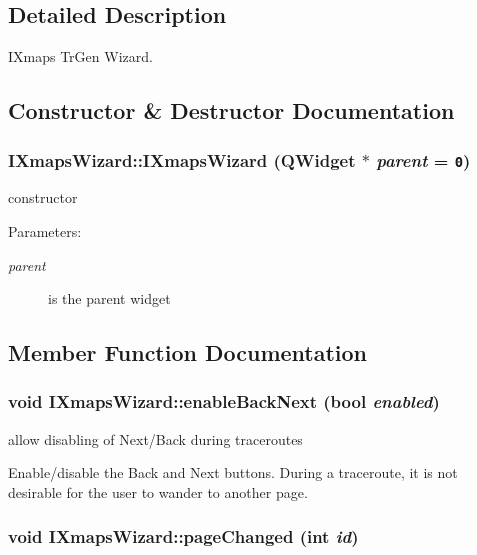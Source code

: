 \subsection{Detailed Description}
IXmaps TrGen Wizard. 

\subsection{Constructor \& Destructor Documentation}
\hypertarget{classIXmapsWizard_eb12ce3ab9cfbc2fcd1f7c84adfedea2}{
\subsubsection[IXmapsWizard]{\setlength{\rightskip}{0pt plus 5cm}IXmapsWizard::IXmapsWizard (QWidget $\ast$ {\em parent} = {\tt 0})}}
\label{classIXmapsWizard_eb12ce3ab9cfbc2fcd1f7c84adfedea2}


constructor \begin{Desc}
\item[Parameters:]
\begin{description}
\item[{\em parent}]is the parent widget \end{description}
\end{Desc}


\subsection{Member Function Documentation}
\hypertarget{classIXmapsWizard_142598b5e0943b66b8817cc7da82c979}{
\subsubsection[enableBackNext]{\setlength{\rightskip}{0pt plus 5cm}void IXmapsWizard::enableBackNext (bool {\em enabled})}}
\label{classIXmapsWizard_142598b5e0943b66b8817cc7da82c979}


allow disabling of Next/Back during traceroutes 

Enable/disable the Back and Next buttons. During a traceroute, it is not desirable for the user to wander to another page. \hypertarget{classIXmapsWizard_b064d0cb97a40abc8ea405e7001fcce9}{
\subsubsection[pageChanged]{\setlength{\rightskip}{0pt plus 5cm}void IXmapsWizard::pageChanged (int {\em id})}}
\label{classIXmapsWizard_b064d0cb97a40abc8ea405e7001fcce9}


